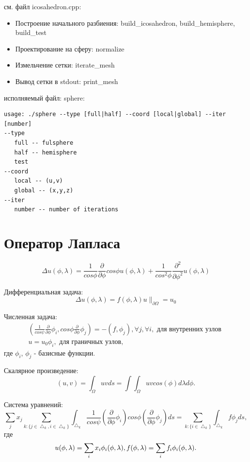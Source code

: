 \documentclass[a4paper,article]{article}
\begin{document}
см. файл icosahedron.cpp:
\begin{itemize}
\item Построение начального разбиения: build\_icosahedron, build\_hemisphere, build\_test
\item Проектирование на сферу: normalize
\item Измельчение сетки: iterate\_mesh
\item Вывод сетки в stdout: print\_mesh
\end{itemize}
исполняемый файл: sphere:
\begin{verbatim}
usage: ./sphere --type [full|half] --coord [local|global] --iter [number]
--type
   full -- fulsphere
   half -- hemisphere
   test
--coord
   local -- (u,v)
   global -- (x,y,z)
--iter
   number -- number of iterations
\end{verbatim}

\section{Оператор Лапласа}
\begin{equation*}
\Delta u(\phi, \lambda) = \frac{1}{cos \phi}\frac{\partial}{\partial \phi} cos \phi u(\phi, \lambda)+\frac{1}{cos^2 \phi}\frac{\partial^2}{\partial\phi^2}u(\phi, \lambda)
\end{equation*}

Дифференциальная задача:
\begin{equation*}
\Delta u(\phi, \lambda) = f(\phi, \lambda)
u\|_{\partial\Omega} = u_0
\end{equation*}

Численная задача:
\begin{equation*}
\begin{split}
(\frac{1}{cos\psi}\frac{\partial}{\partial \phi} \phi_i, cos\phi \frac{\partial}{\partial \phi} \phi_j) = -(f, \phi_j), \forall j, \forall i, \text{ для внутренних узлов } \\
u = u_0 \phi_i, \text { для граничных узлов, }
\end{split}
\end{equation*}
где $\phi_i$, $\phi_j$ - базисные функции.

Скалярное произведение:
\begin{equation*}
(u, v) = \int_\Omega u v ds = \int\int_\Omega u v cos(\phi)d\lambda d\phi.
\end{equation*}

Система уравнений:
\begin{equation*}
\sum_j x_j \sum_{k: \{j\in\bigtriangleup_k, i\in\bigtriangleup_k\}}\int_{\bigtriangleup_k}\frac{1}{cos\psi}(\frac{\partial}{\partial \phi} \phi_i) cos\phi (\frac{\partial}{\partial \phi} \phi_j) ds = \sum_{k:\{i\in\bigtriangleup_k\}}\int_{\bigtriangleup_k}f \phi_j ds,
\end{equation*}
где
\begin{equation*}
u(\phi,\lambda)=\sum_i x_i \phi_i(\phi, \lambda),\\
f(\phi,\lambda)=\sum_i f_i \phi_i(\phi, \lambda).
\end{equation*}
\end{document}
